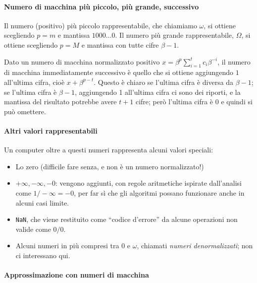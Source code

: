 \documentclass[a4paper]{report}
\theoremstyle{definiton}
\theoremstyle{remark}
\begin{document}
\paragraph{Numero di macchina più piccolo, più grande, successivo}  
Il numero (positivo) più piccolo rappresentabile, che chiamiamo $\omega$, si ottiene scegliendo $p=m$ e mantissa $1000\dots 0$. Il numero più grande rappresentabile, $\Omega$, si ottiene scegliendo $p=M$ e mantissa con tutte cifre $\beta-1$.

Dato un numero di macchina normalizzato positivo $x = \beta^p \sum_{i=1}^t c_i \beta^{-i}$, il numero di macchina immediatamente successivo è quello che si ottiene aggiungendo $1$ all'ultima cifra, cioè $x + \beta^{p-t}$. Questo è chiaro se l'ultima cifra è diversa da $\beta-1$; se l'ultima cifra è $\beta-1$, aggiungendo 1 all'ultima cifra ci sono dei riporti, e la mantissa del risultato potrebbe avere $t+1$ cifre; però l'ultima cifra è $0$ e quindi si può omettere.


\paragraph{Altri valori rappresentabili}

Un computer oltre a questi numeri rappresenta alcuni valori speciali:
\begin{itemize}
    \item Lo zero (difficile fare senza, e non è un numero normalizzato!)
    \item $+\infty, -\infty, -0$: vengono aggiunti, con regole aritmetiche ispirate dall'analisi come $1/-\infty = -0$, per far sì che gli algoritmi possano funzionare anche in alcuni casi limite.
    \item \texttt{NaN}, che viene restituito come ``codice d'errore'' da alcune operazioni non valide come $0/0$.
    \item Alcuni numeri in più compresi tra $0$ e $\omega$, chiamati \emph{numeri denormalizzati}; non ci interessano qui.
\end{itemize}

\paragraph{Approssimazione con numeri di macchina}
\end{document}
